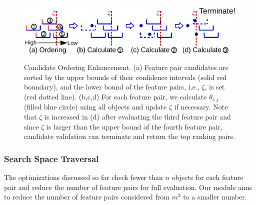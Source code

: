 \begin{figure}[h]
 \centering
 \vspace{-10mm}
 \includegraphics[width=\linewidth]{fig/candidate_ordering.pdf}
 \vspace{-8mm}
\caption{Candidate Ordering Enhancement. (a) Feature pair candidates are sorted by the upper bounds of their confidence intervals (solid red boundary), and the lower bound of the \topthree feature pairs, i.e., $\zeta$, is set (red dotted line). (b,c,d) For each feature pair, we calculate $\theta_{i,j}$ (filled blue circle) using all objects and update $\zeta$ if necessary. Note that $\zeta$ is increased in (d) after evaluating the third feature pair and since $\zeta$ is larger than the upper bound of the fourth feature pair, candidate validation can terminate and return the top ranking pairs.}
\vspace{-5mm}
\label{fig:candidate_ordering}
\end{figure}

\subsubsection{Search Space Traversal} \label{ssec:traversal}

The optimizations discussed so far check fewer 
than $n$ objects for each feature pair and reduce 
the number of feature pairs 
for full evaluation. Our \traversal module 
aims to reduce the number of feature pairs 
considered from $m^2$ to a smaller number.

